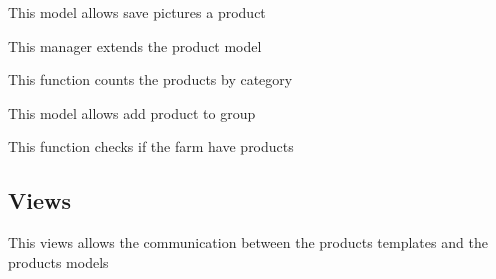 \documentclass[letterpaper,10pt,english]{sphinxmanual}
\begin{document}

\begin{fulllineitems}
\label{modules/product:apps.product.models.ProductImage}
This model allows save pictures a product

\end{fulllineitems}


\begin{fulllineitems}
\label{modules/product:apps.product.models.ProductManager}
This manager extends the product model

\begin{fulllineitems}
\label{modules/product:apps.product.models.ProductManager.counCategories}
This function counts the products by category

\end{fulllineitems}


\end{fulllineitems}


\begin{fulllineitems}
\label{modules/product:apps.product.models.ProductsGroup}
This model allows add product to group

\end{fulllineitems}


\begin{fulllineitems}
\label{modules/product:apps.product.models.haveProductsFarm}
This function checks if the farm have products

\end{fulllineitems}



\subsection{Views}
\label{modules/product:views}
This views allows the communication between the products templates and the products models
\label{modules/product:module-apps.product.views}
\end{document}
